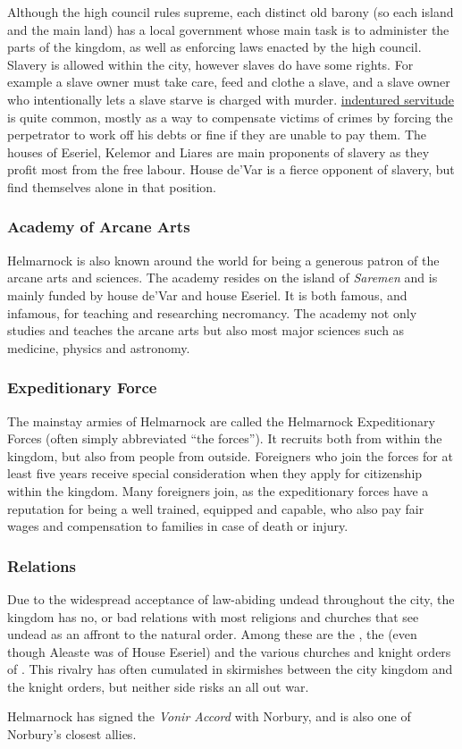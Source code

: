 Although the high council rules supreme, each distinct old barony (so each
island and the main land) has a local government whose main task is to
administer the parts of the kingdom, as well as enforcing laws enacted by the
high council. Slavery is allowed within the city, however slaves do have
some rights. For example a slave owner must take care, feed and clothe a
slave, and a slave owner who intentionally lets a slave starve is charged with
murder. \hyperref[sec:Indentured Servitude]{indentured servitude} is quite
common, mostly as a way to compensate victims of crimes by forcing the
perpetrator to work off his debts or fine if they are unable to pay them. The
houses of Eseriel, Kelemor and Liares are main proponents of slavery as they
profit most from the free labour. House de'Var is a fierce opponent of
slavery, but find themselves alone in that position.

\subsubsection{Academy of Arcane Arts}

Helmarnock is also known around the world for being a generous patron of the
arcane arts and sciences. The academy resides on the island of \emph{Saremen}
and is mainly funded by house de'Var and house Eseriel. It is both famous,
and infamous, for teaching and researching necromancy. The academy not only
studies and teaches the arcane arts but also most major sciences such as
medicine, physics and astronomy.

\subsubsection{Expeditionary Force}
\label{sec:Expeditionary Force}

The mainstay armies of Helmarnock are called the Helmarnock Expeditionary
Forces (often simply abbreviated ``the forces''). It recruits both from within
the kingdom, but also from people from outside. Foreigners who join the forces
for at least five years receive special consideration when they apply for
citizenship within the kingdom. Many foreigners join, as the expeditionary
forces have a reputation for being a well trained, equipped and capable, who
also pay fair wages and compensation to families in case of death or injury.

\subsubsection{Relations}

Due to the widespread acceptance of law-abiding undead throughout the city,
the kingdom has no, or bad relations with most religions and churches that see
undead as an affront to the natural order. Among these are the
, the  (even
though Aleaste was of House Eseriel) and the various churches and knight
orders of . This rivalry has often cumulated in skirmishes
between the city kingdom and the knight orders, but neither side risks an all
out war.

Helmarnock has signed the \emph{Vonir Accord} with Norbury, and is also one
of Norbury's closest allies.
